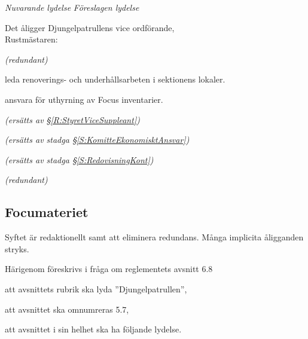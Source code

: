 \documentclass{article}
\newenvironment{lydelse}
    {\begin{paracol}{2}%
        \emph{Nuvarande lydelse}%
        \switchcolumn%
        \emph{Föreslagen lydelse}%
    \end{paracol}%
    \begin{enumerate}[label=\thesubsection.\arabic*]%
    \begin{paracol}{2}%
    }{\end{paracol}\end{enumerate}}
\begin{document}
\begin{lydelse}
    \vspace{1.15em}
    \item Det åligger Djungelpatrullens vice ordförande, \\ Rustmästaren:\vspace{-0.2em}
    \begin{aligganden}
        \item[] \emph{(redundant)} \vspace{1.2em}
        \item leda renoverings- och underhållsarbeten i sektionens lokaler.\vspace{0.2em}
        \item ansvara för uthyrning av Focus inventarier.\vspace{0.2em}
        \item[] \emph{(ersätts av \S \ref{R:StyretViceSuppleant})}
    \end{aligganden}
    
    \vspace{3.8em}
    \begin{aligganden}
        \item[] \emph{(ersätts av stadga \S \ref{S:KomitteEkonomisktAnsvar})}\vspace{1.6em}
        \item[] \emph{(ersätts av stadga \S \ref{S:RedovisningKont})}\vspace{1.6em}
        \item[] \emph{(redundant)}
    \end{aligganden}
    
    
\end{lydelse}

\subsection{Focumateriet}
Syftet är redaktionellt samt att eliminera redundans.
Många implicita åligganden stryks.

Härigenom föreskrivs i fråga om reglementets avsnitt 6.8

\begin{dels}
    \item att avsnittets rubrik ska lyda ''Djungelpatrullen'',
    \item att avsnittet ska omnumreras 5.7,
    \item att avsnittet i sin helhet ska ha följande lydelse.
\end{dels}
\end{document}
